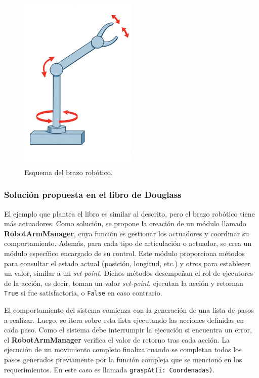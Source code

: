 \begin{figure}[h]
\caption{Esquema del brazo robótico.}
\label{brazoEsquema}
\begin{centering}
{\includegraphics[width=0.5\textwidth]{brazo3.png}\par}
\end{centering}
\end{figure}

\subsubsection*{Solución propuesta en el libro de Douglass}

El ejemplo que plantea el libro es similar al descrito, pero el brazo robótico tiene más actuadores. Como solución, se propone la creación de un módulo llamado \textbf{RobotArmManager}, cuya función es gestionar los actuadores y coordinar su comportamiento. Además, para cada tipo de articulación o actuador, se crea un módulo específico encargado de su control. Este módulo proporciona métodos para consultar el estado actual (posición, longitud, etc.) y otros para establecer un valor, similar a un \textit{set-point}. Dichos métodos desempeñan el rol de ejecutores de la acción, es decir, toman un valor \textit{set-point}, ejecutan la acción y retornan \verb|True| si fue satisfactoria, o \verb|False| en caso contrario.

El comportamiento del sistema comienza con la generación de una lista de pasos a realizar. Luego, se itera sobre esta lista ejecutando las acciones definidas en cada paso. Como el sistema debe interrumpir la ejecución si encuentra un error, el \textbf{RobotArmManager} verifica el valor de retorno tras cada acción. La ejecución de un movimiento completo finaliza cuando se completan todos los pasos generados previamente por la función compleja que se mencionó en los requerimientos. En este caso es llamada \verb|graspAt(i: Coordenadas)|.

